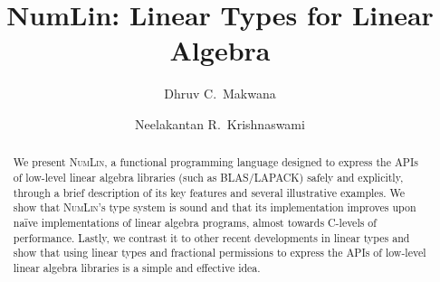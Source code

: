 \documentclass[runningheads,a4paper,twoside]{llncs}
\begin{document}
\title{NumLin: Linear Types for Linear Algebra}


\newcommand{\lang}{\textsc{NumLin}}

\author{Dhruv C.~Makwana \and
Neelakantan R.~Krishnaswami}
%

%
\maketitle
%
\begin{abstract}
    We present \lang, a functional programming language designed to express
    the APIs of low-level linear algebra libraries (such as BLAS/LAPACK) safely
    and explicitly, through a brief description of its key features and several
    illustrative examples. We show that \lang's type system is sound and that
    its implementation improves upon na{\"i}ve implementations of linear
    algebra programs, almost towards C-levels of performance. Lastly, we contrast
    it to other recent developments in linear types and show that using linear
    types and fractional permissions to express the APIs of low-level linear
    algebra libraries is a simple and effective idea.
\end{abstract}















\clearpage
\appendix

\end{document}
